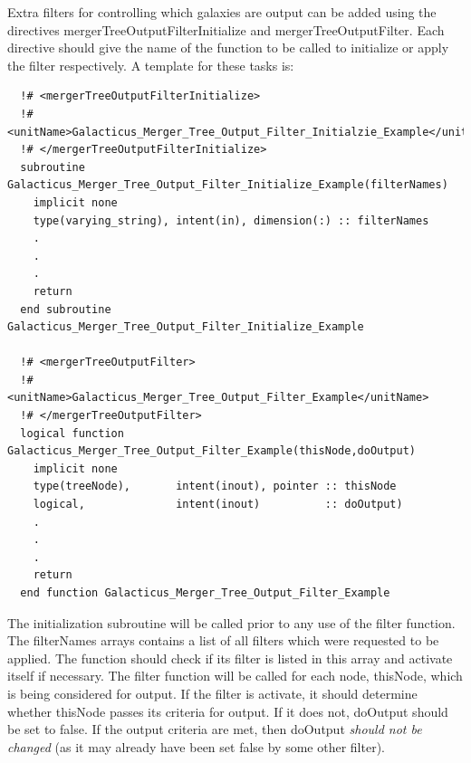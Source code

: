 Extra filters for controlling which galaxies are output can be added using the directives {\normalfont \ttfamily mergerTreeOutputFilterInitialize} and {\normalfont \ttfamily mergerTreeOutputFilter}. Each directive should give the name of the function to be called to initialize or apply the filter respectively. A template for these tasks is:
\begin{verbatim}
  !# <mergerTreeOutputFilterInitialize>
  !#  <unitName>Galacticus_Merger_Tree_Output_Filter_Initialzie_Example</unitName>
  !# </mergerTreeOutputFilterInitialize>
  subroutine Galacticus_Merger_Tree_Output_Filter_Initialize_Example(filterNames)
    implicit none
    type(varying_string), intent(in), dimension(:) :: filterNames
    .
    .
    .
    return
  end subroutine Galacticus_Merger_Tree_Output_Filter_Initialize_Example

  !# <mergerTreeOutputFilter>
  !#  <unitName>Galacticus_Merger_Tree_Output_Filter_Example</unitName>
  !# </mergerTreeOutputFilter>
  logical function Galacticus_Merger_Tree_Output_Filter_Example(thisNode,doOutput)
    implicit none
    type(treeNode),       intent(inout), pointer :: thisNode
    logical,              intent(inout)          :: doOutput)
    .
    .
    .
    return
  end function Galacticus_Merger_Tree_Output_Filter_Example
\end{verbatim}
The initialization subroutine will be called prior to any use of the filter function. The {\normalfont \ttfamily filterNames} arrays contains a list of all filters which were requested to be applied. The function should check if its filter is listed in this array and activate itself if necessary. The filter function will be called for each node, {\normalfont \ttfamily thisNode}, which is being considered for output. If the filter is activate, it should determine whether {\normalfont \ttfamily thisNode} passes its criteria for output. If it does not, {\normalfont \ttfamily doOutput} should be set to false. If the output criteria are met, then {\normalfont \ttfamily doOutput} \emph{should not be changed} (as it may already have been set false by some other filter).

